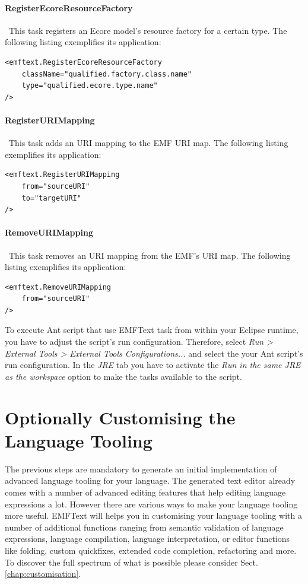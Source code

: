	\paragraph*{RegisterEcoreResourceFactory}~This task registers an Ecore
	model's resource factory for a certain type. 
	The following listing exemplifies its application:
\begin{lstlisting}
<emftext.RegisterEcoreResourceFactory
	className="qualified.factory.class.name"
	type="qualified.ecore.type.name"
/>
\end{lstlisting}
	\paragraph*{RegisterURIMapping}~This task adds an URI mapping to the EMF URI
	map. 
	The following listing exemplifies its application:
\begin{lstlisting}
<emftext.RegisterURIMapping
	from="sourceURI"
	to="targetURI"
/>
\end{lstlisting}

\paragraph*{RemoveURIMapping}~This task removes an URI mapping from the EMF's
URI map. 
The following listing exemplifies its application: 
\begin{lstlisting}
<emftext.RemoveURIMapping
	from="sourceURI"
/>
\end{lstlisting}
	
	
	To execute Ant script that use EMFText task from within your Eclipse runtime,
	you have to adjust the script's run configuration. Therefore, select 
	\emph{Run > External Tools > External Tools Configurations...} and select the
	your Ant script's run configuration. In the \emph{JRE} tab you have to
	activate the \emph{Run in the same JRE as the workspace} option to make the
	\EMFText tasks available to the script.
	
\section{Optionally Customising the Language Tooling}

The previous steps are mandatory to generate an initial implementation of
advanced language tooling for your language. The generated text editor already
comes with a number of advanced editing features that help editing language
expressions a lot. However there are various ways to make your language tooling
more useful. EMFText will helps you in customising your language tooling with a
number of additional functions ranging from semantic validation of language
expressions, language compilation, language interpretation, or editor functions
like folding, custom quickfixes, extended code completion, refactoring and more.
To discover the full spectrum of what is possible please consider Sect.
\ref{chap:customisation}.
